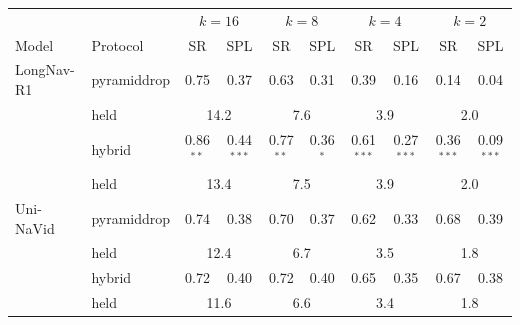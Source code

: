 \begin{tabular}{llcccccccc}
\toprule
 & & \multicolumn{2}{c}{$k=16$} & \multicolumn{2}{c}{$k=8$} & \multicolumn{2}{c}{$k=4$} & \multicolumn{2}{c}{$k=2$} \\
Model & Protocol & SR & SPL & SR & SPL & SR & SPL & SR & SPL \\
\midrule
LongNav-R1 & pyramiddrop & 0.75 & 0.37 & 0.63 & 0.31 & 0.39 & 0.16 & 0.14 & 0.04 \\
 & \quad held & \multicolumn{2}{c}{14.2} & \multicolumn{2}{c}{7.6} & \multicolumn{2}{c}{3.9} & \multicolumn{2}{c}{2.0} \\
 & hybrid & 0.86$^{**}$ & 0.44$^{***}$ & 0.77$^{**}$ & 0.36$^{*}$ & 0.61$^{***}$ & 0.27$^{***}$ & 0.36$^{***}$ & 0.09$^{***}$ \\
 & \quad held & \multicolumn{2}{c}{13.4} & \multicolumn{2}{c}{7.5} & \multicolumn{2}{c}{3.9} & \multicolumn{2}{c}{2.0} \\
\midrule
Uni-NaVid & pyramiddrop & 0.74 & 0.38 & 0.70 & 0.37 & 0.62 & 0.33 & 0.68 & 0.39 \\
 & \quad held & \multicolumn{2}{c}{12.4} & \multicolumn{2}{c}{6.7} & \multicolumn{2}{c}{3.5} & \multicolumn{2}{c}{1.8} \\
 & hybrid & 0.72 & 0.40 & 0.72 & 0.40 & 0.65 & 0.35 & 0.67 & 0.38 \\
 & \quad held & \multicolumn{2}{c}{11.6} & \multicolumn{2}{c}{6.6} & \multicolumn{2}{c}{3.4} & \multicolumn{2}{c}{1.8} \\
\bottomrule
\end{tabular}
